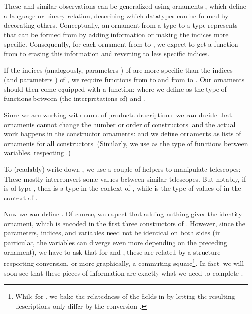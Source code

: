 These and similar observations can be generalized using ornaments \cite{algorn}, which define a language or binary relation, describing which datatypes can be formed by decorating others. Conceptually, an ornament from a type  to a type  represents that  can be formed from  by adding information or making the indices more specific. Consequently, for each ornament from  to , we expect to get a function from  to  erasing this information and reverting to less specific indices.

If the indices  (analogously, parameters ) of  are more specific than the indices  (and parameters ) of , we require functions from  to  and from  to . Our ornaments
should then come equipped with a function:
where we define  as the type of functions between (the interpretations of)  and .

Since we are working with sums of products descriptions, we can decide that ornaments cannot change the number or order of constructors, and the actual work happens in the constructor ornaments:
and we define ornaments as lists of ornaments for all constructors:
(Similarly, we use  as the type of functions between variables, respecting .)

To (readably) write down , we use a couple of helpers to manipulate telescopes:
These mostly interconvert some values between similar telescopes. But notably, if  is of type , then  is a type in the context of , while  is the type of values of  in the context of .

Now we can define . Of course, we expect that adding nothing gives the identity ornament, which is encoded in the first three constructors of .
However, since the parameters, indices, and variables need not be identical on both sides (in particular, the variables can diverge even more depending on the preceding ornament), we have to ask that for  and , these are related by a structure respecting conversion, or more graphically, a commuting square\footnote{While for , we bake the relatedness of the fields in by letting the resulting descriptions only differ by the conversion .}. In fact, we will soon see that these pieces of information are exactly what we need to complete .

